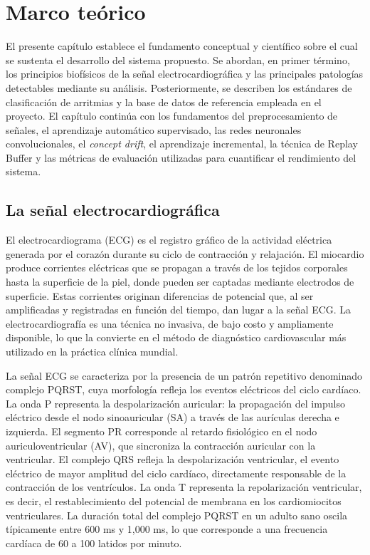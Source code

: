 
 

\chapter{Marco teórico}

El presente capítulo establece el fundamento conceptual y científico sobre el cual se sustenta el desarrollo del sistema propuesto. Se abordan, en primer término, los principios biofísicos de la señal electrocardiográfica y las principales patologías detectables mediante su análisis. Posteriormente, se describen los estándares de clasificación de arritmias y la base de datos de referencia empleada en el proyecto. El capítulo continúa con los fundamentos del preprocesamiento de señales, el aprendizaje automático supervisado, las redes neuronales convolucionales, el \textit{concept drift}, el aprendizaje incremental, la técnica de Replay Buffer y las métricas de evaluación utilizadas para cuantificar el rendimiento del sistema.

\section{La señal electrocardiográfica}

El electrocardiograma (ECG) es el registro gráfico de la actividad eléctrica generada por el corazón durante su ciclo de contracción y relajación. El miocardio produce corrientes eléctricas que se propagan a través de los tejidos corporales hasta la superficie de la piel, donde pueden ser captadas mediante electrodos de superficie. Estas corrientes originan diferencias de potencial que, al ser amplificadas y registradas en función del tiempo, dan lugar a la señal ECG. La electrocardiografía es una técnica no invasiva, de bajo costo y ampliamente disponible, lo que la convierte en el método de diagnóstico cardiovascular más utilizado en la práctica clínica mundial.

La señal ECG se caracteriza por la presencia de un patrón repetitivo denominado complejo PQRST, cuya morfología refleja los eventos eléctricos del ciclo cardíaco. La onda P representa la despolarización auricular: la propagación del impulso eléctrico desde el nodo sinoauricular (SA) a través de las aurículas derecha e izquierda. El segmento PR corresponde al retardo fisiológico en el nodo auriculoventricular (AV), que sincroniza la contracción auricular con la ventricular. El complejo QRS refleja la despolarización ventricular, el evento eléctrico de mayor amplitud del ciclo cardíaco, directamente responsable de la contracción de los ventrículos. La onda T representa la repolarización ventricular, es decir, el restablecimiento del potencial de membrana en los cardiomiocitos ventriculares. La duración total del complejo PQRST en un adulto sano oscila típicamente entre 600 ms y 1,000 ms, lo que corresponde a una frecuencia cardíaca de 60 a 100 latidos por minuto.


